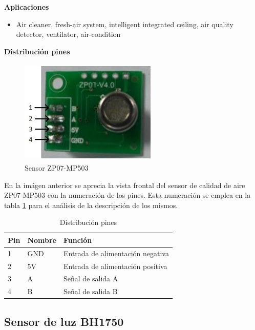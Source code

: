 \textbf{Aplicaciones}
\begin{itemize}
    \item Air cleaner, fresh-air system, intelligent integrated ceiling, air quality detector, ventilator, air-condition
\end{itemize}

\textbf{Distribución pines}

\begin{figure}[H]
    \centering
    \includegraphics[width=6.5cm, height=5cm]{imagenes/sensor zp07.jpg}
    \caption{Sensor ZP07-MP503}
    \label{imag:ZP07}
\end{figure}

En la imágen anterior se aprecia la vista frontal del sensor de calidad de aire ZP07-MP503 con la numeración de los pines. Esta numeración se emplea en la tabla \ref{tab:pines_ZP07} para el análisis de la descripción de los mismos.

\begin{table}[H]
    \centering
    \caption{Distribución pines}
    \label{tab:pines_ZP07}
    \begin{tabular}{|l|l|l|}
    \hline
    \rowcolor[HTML]{9698ED} 
    Pin & Nombre & Función                          \\ \hline
    1   & GND    & Entrada de alimentación negativa \\ \hline
    2   & 5V     & Entrada de alimentación positiva \\ \hline
    3   & A      & Señal de salida A                \\ \hline
    4   & B      & Señal de salida B                \\ \hline
    \end{tabular}
\end{table}


\subsection{Sensor de luz BH1750}

